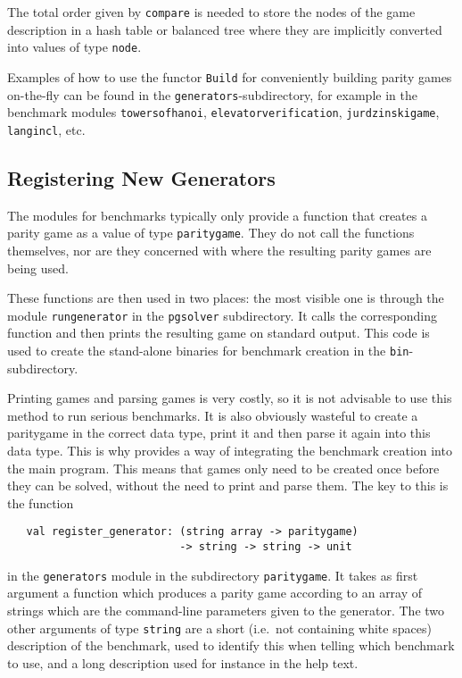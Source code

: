 The total order given by \verb#compare# is needed to store the nodes of the game description in a hash table or balanced
tree where they are implicitly converted into values of type \verb#node#.

Examples of how to use the functor \verb#Build# for conveniently building parity games on-the-fly can be found in the
\texttt{generators}-subdirectory, for example in the benchmark modules \texttt{towersofhanoi}, \texttt{elevatorverification},
\texttt{jurdzinskigame}, \texttt{langincl}, etc.

\subsection{Registering New Generators}

The modules for benchmarks typically only provide a function that creates a parity game as a value of type \verb#paritygame#.
They do not call the functions themselves, nor are they concerned with where the resulting parity games are being used.

These functions are then used in two places: the most visible one is through the module \texttt{rungenerator} in the 
\texttt{pgsolver} subdirectory. It calls the corresponding function and then prints the resulting game on standard output.
This code is used to create the stand-alone binaries for benchmark creation in the \texttt{bin}-subdirectory.

Printing games and parsing games is very costly, so it is not advisable to use this method to run serious benchmarks. It is
also obviously wasteful to create a paritygame in the correct data type, print it and then parse it again into this data type.
This is why \pgsolver provides a way of integrating the benchmark creation into the main program. This means that games only
need to be created once before they can be solved, without the need to print and parse them. The key to this is the function
\begin{verbatim}
   val register_generator: (string array -> paritygame) 
                           -> string -> string -> unit
\end{verbatim}
in the \texttt{generators} module in the subdirectory \texttt{paritygame}. It takes as first argument a function which 
produces a parity game according to an array of strings which are the command-line parameters given to the generator. The
two other arguments of type \verb#string# are a short (i.e.\ not containing white spaces) description of the benchmark,
used to identify this when telling \pgsolver which benchmark to use, and a long description used for instance in the help
text. 

